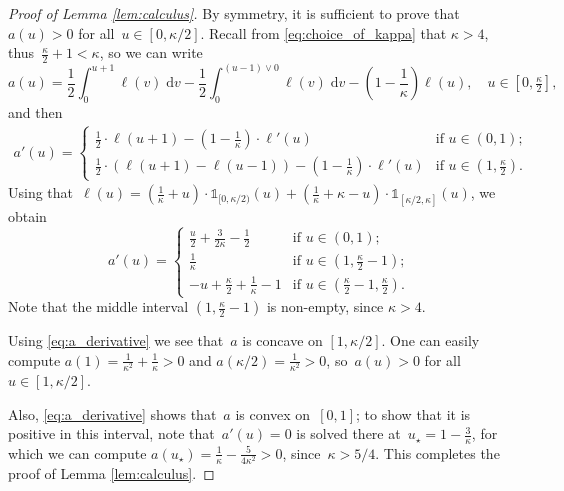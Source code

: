 \documentclass[a4paper,12pt]{article}
\begin{document}
\begin{proof}[Proof of Lemma \ref{lem:calculus}]
 By symmetry, it is sufficient to prove that~$a(u) > 0$ for all~$u \in [0,\kappa/2]$.
 Recall from \eqref{eq:choice_of_kappa} that $\kappa >4$, thus~$\tfrac{\kappa}{2} + 1 < \kappa$, so we can write
$$a(u)= \frac12\int_0^{u+1} \ell(v)\;\textrm{d}v - \frac12\int_0^{(u-1)\vee 0} \ell(v)\;\textrm{d}v - \left(1-\frac{1}{\kappa}\right)\ell(u), \quad u \in [0,\tfrac{\kappa}{2}],$$
and then
\begin{align*}
a'(u) = \begin{cases}\frac12 \cdot \ell(u+1) - \left(1-\frac{1}{\kappa}\right)\cdot \ell'(u)&\text{if } u \in (0,1);\\[.2cm] \frac12 \cdot (\ell(u+1) - \ell(u-1)) - \left(1-\frac{1}{\kappa}\right)\cdot \ell'(u)&\text{if } u \in (1,\tfrac{\kappa}{2}). \end{cases}
\end{align*}
Using  that~$\ell(u) = (\tfrac{1}{\kappa} + u) \cdot \mathds{1}_{[0,\kappa/2)}(u) + (\tfrac{1}{\kappa} + \kappa -u) \cdot \mathds{1}_{[\kappa/2, \kappa]}(u)$,  we obtain
\begin{equation} \label{eq:a_derivative} a'(u) = \begin{cases} \frac{u}{2} + \tfrac{3}{2\kappa} - \tfrac{1}{2}& \text{if } u \in (0,1);\\[.2cm] \frac{1}{\kappa}& \text{if } u \in (1,\tfrac{\kappa}{2} - 1);\\[.2cm] - u+ \tfrac{\kappa}{2}    + \tfrac{1}{\kappa}- 1 &\text{if } u \in (\tfrac{\kappa}{2}-1,\tfrac{\kappa}{2}).\end{cases}\end{equation}
Note that the middle interval $(1,\tfrac{\kappa}{2} - 1)$ is non-empty, since $\kappa>4$.

\smallskip

 Using \eqref{eq:a_derivative} we see that~$a$ is concave on $[1,\kappa/2]$. One can easily compute
$a(1) = \frac{1}{\kappa^2} + \frac{1}{\kappa} > 0$ and $a(\kappa/2) = \frac{1}{\kappa^2} > 0$, so~$a(u) > 0$ for all~$u \in [1,\kappa/2]$.


Also, \eqref{eq:a_derivative} shows that~$a$ is convex on~$[0,1]$; to show that it is positive in this interval, note that~$a'(u) = 0$ is solved there at~$u_\star = 1 -\tfrac{3}{\kappa}$, for which we can compute
$a(u_\star) = \frac{1}{\kappa} - \frac{5}{4\kappa^2}> 0$, since~$\kappa > 5/4$. This completes the proof of Lemma \ref{lem:calculus}.
\end{proof}
\end{document}
